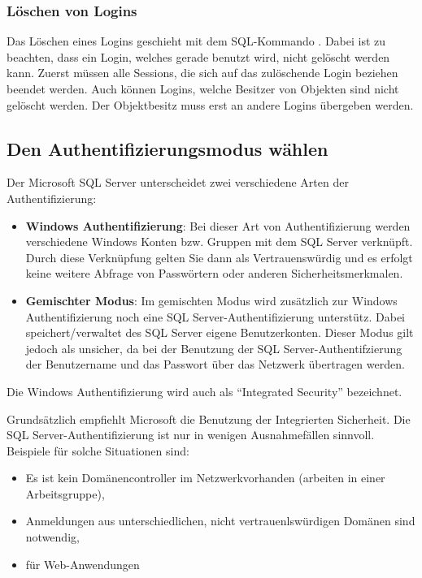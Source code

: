         \subsubsection{Löschen von Logins}
          Das Löschen eines Logins geschieht mit dem
          SQL-Kommando . Dabei ist zu beachten, dass
          ein Login, welches gerade benutzt wird, nicht gelöscht werden kann.
          Zuerst müssen alle Sessions, die sich auf das zulöschende Login
          beziehen beendet werden. Auch können Logins, welche Besitzer von
          Objekten sind nicht gelöscht werden. Der Objektbesitz muss erst an
          andere Logins übergeben werden.
          \begin{literaturinternet}
            \item \cite{ms188012}
          \end{literaturinternet}
      \subsection{Den Authentifizierungsmodus wählen}
        Der Microsoft SQL Server unterscheidet zwei verschiedene Arten der
        Authentifizierung:
        \begin{itemize}
            \item \textbf{Windows Authentifizierung}: Bei dieser Art von
            Authentifizierung werden verschiedene Windows Konten bzw. Gruppen
            mit dem SQL Server verknüpft. Durch diese Verknüpfung gelten Sie
            dann als Vertrauenswürdig und es erfolgt keine weitere Abfrage von
            Passwörtern oder anderen Sicherheitsmerkmalen. 
            \item \textbf{Gemischter Modus}: Im gemischten Modus wird zusätzlich
            zur Windows Authentifizierung noch eine SQL Server-Authentifizierung
            unterstütz. Dabei speichert/verwaltet des SQL Server eigene
            Benutzerkonten. Dieser Modus gilt jedoch als unsicher, da bei der
            Benutzung der SQL Server-Authentifzierung der Benutzername und das
            Passwort über das Netzwerk übertragen werden.
        \end{itemize}
        \begin{merke}
          Die Windows Authentifizierung wird auch als \enquote{Integrated
          Security} bezeichnet.
        \end{merke}
        Grundsätzlich empfiehlt Microsoft die Benutzung der Integrierten
        Sicherheit. Die SQL Server-Authentifizierung ist nur in wenigen
        Ausnahmefällen sinnvoll. Beispiele für solche Situationen sind:
        \begin{itemize}
          \item Es ist kein Domänencontroller im Netzwerkvorhanden (arbeiten
          in einer Arbeitsgruppe),
          \item Anmeldungen aus unterschiedlichen, nicht vertrauenlswürdigen
          Domänen sind notwendig,
          \item für Web-Anwendungen
        \end{itemize}
